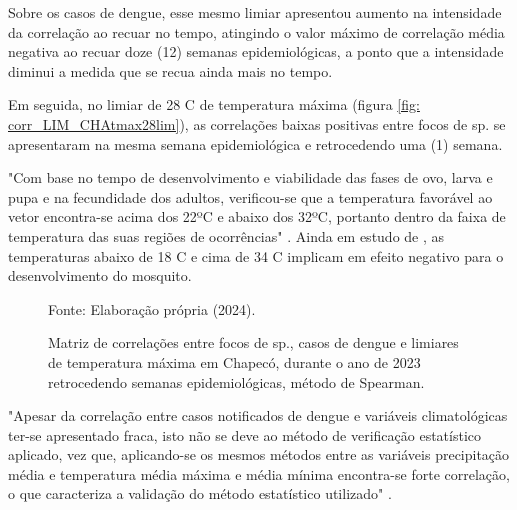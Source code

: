 \indent Sobre os casos de dengue, esse mesmo limiar apresentou aumento na intensidade da correlação ao recuar no tempo, atingindo o valor máximo de correlação média negativa ao recuar doze (12) semanas epidemiológicas, a ponto que a intensidade diminui a medida que se recua ainda mais no tempo.

\indent Em seguida, no limiar de 28 C de temperatura máxima (figura \ref{fig: corr_LIM_CHAtmax28lim}), as correlações baixas positivas entre focos de  sp. se apresentaram na mesma semana epidemiológica e retrocedendo uma (1) semana.


\indent "Com base no tempo de desenvolvimento e viabilidade das fases de ovo, larva e pupa e na fecundidade dos adultos, verificou-se que a temperatura favorável ao vetor encontra-se acima dos 22ºC e abaixo dos 32ºC, portanto dentro da faixa de temperatura das suas regiões de ocorrências" \cite{AedesTemp}. Ainda em estudo de , as temperaturas abaixo de 18 C e cima de 34 C implicam em efeito negativo para o desenvolvimento do mosquito.

\begin{figure}[htbp]
    \begin{center}
    \caption{Matriz de correlações entre focos de  sp., casos de dengue e limiares de temperatura máxima em Chapecó, durante o ano de 2023 retrocedendo semanas epidemiológicas, método de Spearman.}
    \label{fig: matriz_corr_LIM_CHAtmax}
        \hfill
    \end{center}
    \small{Fonte: Elaboração própria (2024).}
\end{figure}

\begin{citacao}
"Apesar da correlação entre casos notificados de dengue e variáveis climatológicas ter-se apresentado fraca, isto não se deve ao método de verificação estatístico aplicado, vez que, aplicando-se os mesmos métodos entre as variáveis precipitação média e temperatura média máxima e média mínima encontra-se forte correlação, o que caracteriza a validação do método estatístico utilizado" \cite[pg-81]{Barbosa2011Dissertação}.
\end{citacao}

